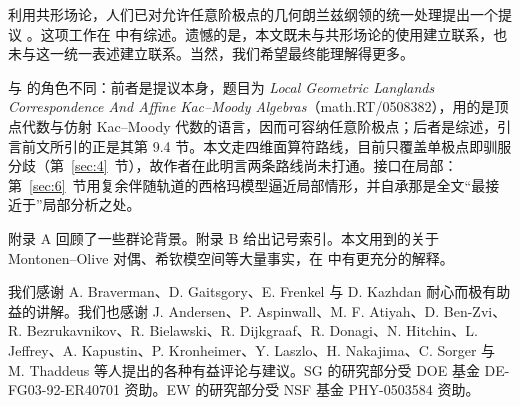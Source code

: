 利用共形场论，人们已对允许任意阶极点的几何朗兰兹纲领的统一处理提出一个提议 \cite{ref6}。这项工作在 \cite{ref7} 中有综述。遗憾的是，本文既未与共形场论的使用建立联系，也未与这一统一表述建立联系。当然，我们希望最终能理解得更多。

\begin{yizhu}[含糊点拨]
\cite{ref6} 与 \cite{ref7} 的角色不同：前者是提议本身，题目为 \emph{Local Geometric Langlands Correspondence And Affine Kac--Moody Algebras}（math.RT/0508382），用的是顶点代数与仿射 Kac--Moody 代数的语言，因而可容纳任意阶极点；后者是综述，引言前文所引的正是其第 9.4 节。本文走四维面算符路线，目前只覆盖单极点即驯服分歧（第~\ref{sec:4}~节），故作者在此明言两条路线尚未打通。接口在局部：第~\ref{sec:6}~节用复余伴随轨道的西格玛模型逼近局部情形，并自承那是全文“最接近于”局部分析之处。
\end{yizhu}

附录 A 回顾了一些群论背景。附录 B 给出记号索引。本文用到的关于 Montonen--Olive 对偶、希钦模空间等大量事实，在 \cite{ref8} 中有更充分的解释。

我们感谢 A. Braverman、D. Gaitsgory、E. Frenkel 与 D. Kazhdan 耐心而极有助益的讲解。我们也感谢 J. Andersen、P. Aspinwall、M. F. Atiyah、D. Ben-Zvi、R. Bezrukavnikov、R. Bielawski、R. Dijkgraaf、R. Donagi、N. Hitchin、L. Jeffrey、A. Kapustin、P. Kronheimer、Y. Laszlo、H. Nakajima、C. Sorger 与 M. Thaddeus 等人提出的各种有益评论与建议。SG 的研究部分受 DOE 基金 DE-FG03-92-ER40701 资助。EW 的研究部分受 NSF 基金 PHY-0503584 资助。
